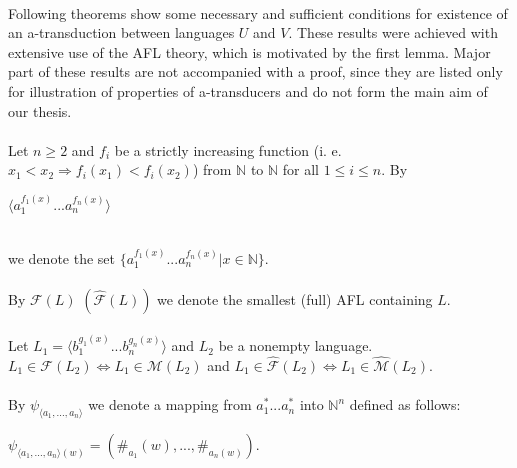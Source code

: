 \paragraph{}
Following theorems show some necessary and sufficient conditions for existence of an a-transduction between languages $U$ and $V$. These results were achieved with extensive use of the AFL theory, which is motivated by the first lemma. Major part of these results are not accompanied with a proof, since they are listed only for illustration of properties of a-transducers and do not form the main aim of our thesis.

\paragraph{}
\oznacenie Let $n \geq 2$ and $f_{i}$ be a strictly increasing function (i. e. $x_{1} < x_{2} \Rightarrow f_{i}(x_{1}) < f_{i}(x_{2})$) from $\mathbb{N} $ to $\mathbb{N} $ for all $ 1 \leq i \leq n$. By \\
\centerline{$\langle a_{1}^{f_{1}(x)}...a_{n}^{f_{n}(x)} \rangle $} \\
we denote the set $\{ a_{1}^{f_{1}(x)}...a_{n}^{f_{n}(x)} | x \in \mathbb{N} \} $.

\paragraph{}
\oznacenie By $\mathcal{F}(L) $ $(\hat{\mathcal{F}} (L) )$ we denote the smallest (full) AFL containing $L$.

\paragraph{}
\clema Let $L_{1} = \langle b_{1}^{g_{1}(x)}...b_{n}^{g_{n}(x)} \rangle $ and $L_{2}$ be a nonempty language. $L_{1} \in \mathcal{F}(L_{2}) \Leftrightarrow L_{1} \in \mathcal{M}(L_{2})$ and $L_{1} \in \hat{\mathcal{F}}(L_{2}) \Leftrightarrow L_{1} \in \hat{\mathcal{M}}(L_{2})$.

\paragraph{}
\oznacenie By $\psi_{\langle a_{1},...,a_{n}\rangle }$ we denote a mapping from $a_{1}^{*}...a_{n}^{*}$ into $\mathbb{N}^{n}$ defined as follows: \\
\centerline{$\psi_{\langle a_{1},...,a_{n}\rangle (w) } = (\# _{a_{1}}(w), ..., \# _{a_{n}(w)}) $.}

